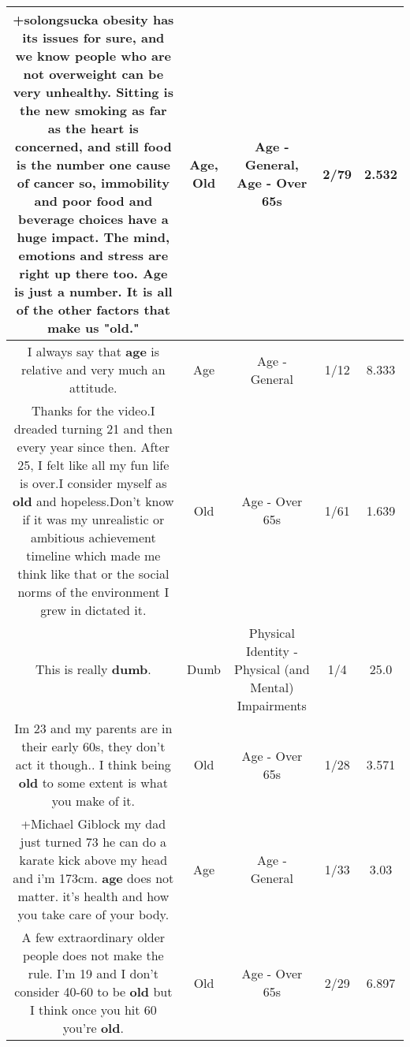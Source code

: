 \documentclass[11pt]{article}
\newlength\mylength
\begin{document}
\begin{center}
\begin{longtable}{|C{.65\mylength}|C{.30\mylength}|C{.12\mylength}|C{.12\mylength}|C{.12\mylength}|}
  \small +solongsucka obesity has its issues for sure, and we know people who are not overweight can be very unhealthy. Sitting is the new smoking as far as the heart is concerned, and still food is the number one cause of cancer so, immobility and poor food and beverage choices have a huge impact. The mind, emotions and stress are right up there too. \textbf{Age} is just a number. It is all of the other factors that make us "\textbf{old}."\normalsize   & Age, Old & Age - General, Age - Over 65s & 2/79 & 2.532 \\  \hline
  \small I always say that \textbf{age} is relative and very much an attitude.\normalsize   & Age & Age - General & 1/12 & 8.333 \\  \hline
  \small Thanks for the video.I dreaded turning 21 and then every year since then. After 25, I felt like all my fun life is over.I consider myself as \textbf{old} and hopeless.Don't know if it was my unrealistic or ambitious achievement timeline which made me think like that or the social norms of the environment I grew in dictated it.\normalsize   & Old & Age - Over 65s & 1/61 & 1.639 \\  \hline
  \small This is really \textbf{dumb}.\normalsize   & Dumb & Physical Identity - Physical (and Mental) Impairments & 1/4 & 25.0 \\  \hline
  \small Im 23 and my parents are in their early 60s, they don't act it though.. I think being \textbf{old} to some extent is what you make of it.\normalsize   & Old & Age - Over 65s & 1/28 & 3.571 \\  \hline
  \small +Michael Giblock my dad just turned 73 he can do a karate kick above my head and i'm 173cm. \textbf{age} does not matter. it's health and how you take care of your body.\normalsize   & Age & Age - General & 1/33 & 3.03 \\  \hline
  \small A few extraordinary older people does not make the rule.  I'm 19 and I don't consider 40-60 to be \textbf{old} but I think once you hit 60 you're \textbf{old}.\normalsize   & Old & Age - Over 65s & 2/29 & 6.897 \\  \hline

\end{longtable}
\end{center}
\end{document}
